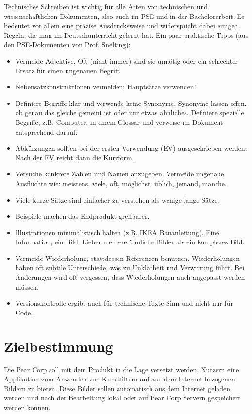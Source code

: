 \documentclass[parskip=full]{scrartcl}
\begin{document}
Technisches Schreiben ist wichtig für alle Arten von technischen und wissenschaftlichen Dokumenten, also auch im PSE und in der Bachelorarbeit.
Es bedeutet vor allem eine präzise Ausdrucksweise und widerspricht dabei einigen Regeln, die man im Deutschunterricht gelernt hat.
Ein paar praktische Tipps (aus den PSE-Dokumenten von Prof. Snelting):
\begin{itemize}[nosep]
\item Vermeide Adjektive.
      Oft (nicht immer) sind sie unnötig oder ein schlechter Ersatz für einen ungenauen Begriff.
\item Nebensatzkonstruktionen vermeiden; Hauptsätze verwenden!
\item Definiere Begriffe klar und verwende keine Synonyme.
      Synonyme lassen offen, ob genau das gleiche gemeint ist oder nur etwas ähnliches.
      Definiere spezielle Begriffe, z.B. \gls{Computer}, in einem Glossar und verweise im Dokument entsprechend darauf.
\item Abkürzungen sollten bei der ersten Verwendung (EV) ausgeschrieben werden.
      Nach der EV reicht dann die Kurzform.
\item Versuche konkrete Zahlen und Namen anzugeben.
      Vermeide ungenaue Ausflüchte wie: meistens, viele, oft, möglichst, üblich, jemand, manche.
\item Viele kurze Sätze sind einfacher zu verstehen als wenige lange Sätze.
\item Beispiele machen das Endprodukt greifbarer.
\item Illustrationen minimalistisch halten (z.B. IKEA Bauanleitung).
      Eine Information, ein Bild.
      Lieber mehrere ähnliche Bilder als ein komplexes Bild.
\item Vermeide Wiederholung, stattdessen Referenzen benutzen.
      Wiederholungen haben oft subtile Unterschiede, was zu Unklarheit und Verwirrung führt.
      Bei Änderungen wird oft vergessen, dass Wiederholungen auch angepasst werden müssen.
\item Versionskontrolle ergibt auch für technische Texte Sinn und nicht nur für Code.
\end{itemize}

%
%
\section{Zielbestimmung}
Die Pear Corp soll mit dem Produkt in die Lage versetzt werden, Nutzern eine Applikation zum Anwenden von Kunstfiltern auf aus dem Internet bezogenen Bildern zu bieten. Diese Bilder sollen automatisch aus dem Internet geladen werden und nach der Bearbeitung lokal oder auf Pear Corp Servern gespeichert werden können.
\end{document}
